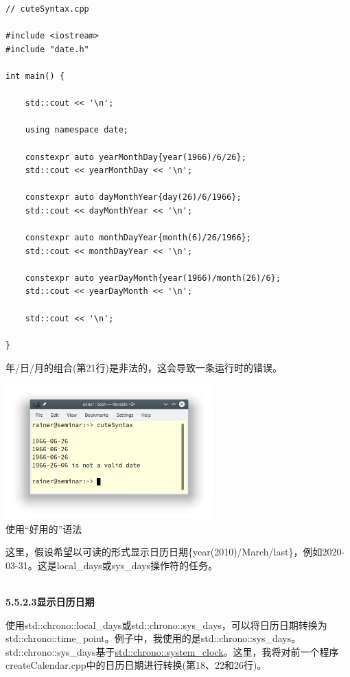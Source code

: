 \begin{lstlisting}[style=styleCXX]
// cuteSyntax.cpp

#include <iostream>
#include "date.h"

int main() {
	
	std::cout << '\n';
	
	using namespace date;
	
	constexpr auto yearMonthDay{year(1966)/6/26};
	std::cout << yearMonthDay << '\n';
	
	constexpr auto dayMonthYear{day(26)/6/1966};
	std::cout << dayMonthYear << '\n';
	
	constexpr auto monthDayYear{month(6)/26/1966};
	std::cout << monthDayYear << '\n';
	
	constexpr auto yearDayMonth{year(1966)/month(26)/6};
	std::cout << yearDayMonth << '\n';
	
	std::cout << '\n';

}
\end{lstlisting}

年/日/月的组合(第21行)是非法的，这会导致一条运行时的错误。

\begin{center}
\includegraphics[width=0.6\textwidth]{content/3/chapter5/images/21.png}\\
使用“好用的”语法
\end{center}

这里，假设希望以可读的形式显示日历日期\{year(2010)/March/last\}，例如2020-03-31。这是local\_days或sys\_days操作符的任务。

\hspace*{\fill} \\ %
\noindent
\textbf{5.5.2.3\hspace{0.2cm}显示日历日期}

使用std::chrono::local\_days或std::chrono::sys\_days，可以将日历日期转换为std::chrono::time\_point。例子中，我使用的是std::chrono::sys\_days。std::chrono::sys\_days基于\href{https://en.cppreference.com/w/cpp/chrono/system_clock}{std::chrono::system\_clock}。这里，我将对前一个程序createCalendar.cpp中的日历日期进行转换(第18、22和26行)。

